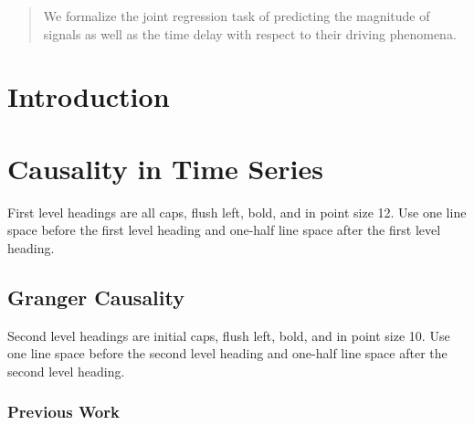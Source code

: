 \documentclass[twoside]{article}
\begin{document}
%

%


\begin{abstract}
  We formalize the joint regression task of predicting the magnitude of signals as well as the time delay with respect to their driving phenomena. 
\end{abstract}

\section{Introduction}


\section{Causality in Time Series}

First level headings are all caps, flush left, bold, and in point size
12. Use one line space before the first level heading and one-half line space
after the first level heading.

\subsection{Granger Causality}

Second level headings are initial caps, flush left, bold, and in point
size 10. Use one line space before the second level heading and one-half line
space after the second level heading.

\subsubsection{Previous Work}
\end{document}
